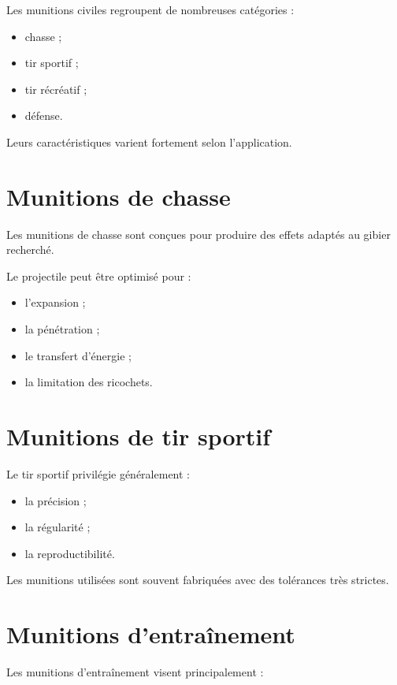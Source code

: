 Les munitions civiles regroupent de nombreuses catégories :

\begin{itemize}
    \item chasse ;
    \item tir sportif ;
    \item tir récréatif ;
    \item défense.
\end{itemize}

Leurs caractéristiques varient fortement selon l'application.

\section{Munitions de chasse}

Les munitions de chasse sont conçues pour produire des effets adaptés au
gibier recherché.

Le projectile peut être optimisé pour :

\begin{itemize}
    \item l'expansion ;
    \item la pénétration ;
    \item le transfert d'énergie ;
    \item la limitation des ricochets.
\end{itemize}

\section{Munitions de tir sportif}

Le tir sportif privilégie généralement :

\begin{itemize}
    \item la précision ;
    \item la régularité ;
    \item la reproductibilité.
\end{itemize}

Les munitions utilisées sont souvent fabriquées avec des tolérances très
strictes.

\section{Munitions d'entraînement}

Les munitions d'entraînement visent principalement :

